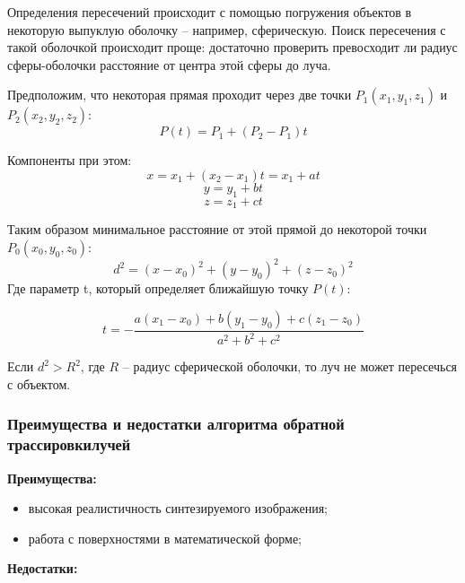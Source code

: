 \documentclass[a4paper,14pt, unknownkeysallowed]{extreport}
\begin{document}
Определения пересечений происходит с помощью погружения объектов в некоторую выпуклую оболочку -- например, сферическую. Поиск пересечения с такой оболочкой происходит проще: достаточно проверить превосходит ли радиус сферы-оболочки расстояние от центра этой сферы до луча.

Предположим, что некоторая прямая проходит через две точки $P_1 (x_1, y_1, z_1)$  и $P_2 (x_2, y_2, z_2)$:
\begin{equation}
	P(t) = P_1 + (P_2 - P_1)t
\end{equation}

Компоненты при этом:
\begin{equation}
	x = x_1 + (x_2 - x_1)t = x_1 + at
\end{equation}
\begin{equation}
	y = y_1 + bt
\end{equation}
\begin{equation}
	z = z_1 + ct
\end{equation}

Таким образом минимальное расстояние от этой прямой до некоторой точки $P_0 (x_0, y_0, z_0)$:
\begin{equation}
	d^2 = (x - x_0)^2 + (y - y_0)^2 + (z - z_0)^2
\end{equation}
Где параметр t, который определяет ближайшую точку $P(t)$:

\begin{equation}
	t = - \frac{a(x_1 - x_0) + b(y_1 - y_0) + c(z_1 - z_0)}{a^2 + b^2 + c^2}
\end{equation}

Если $d^2 > R^2$, где $R$ -- радиус сферической оболочки, то луч не может пересечься с объектом.

\subsubsection[Преимущества и недостатки алгоритма обратной трассировки лучей]{Преимущества и недостатки алгоритма обратной трассировки\linebreak лучей}

\textbf{Преимущества:}

\begin{itemize}
	\item высокая реалистичность синтезируемого изображения;
	\item работа с поверхностями в математической форме;
\end{itemize}

\textbf{Недостатки:}
\end{document}
